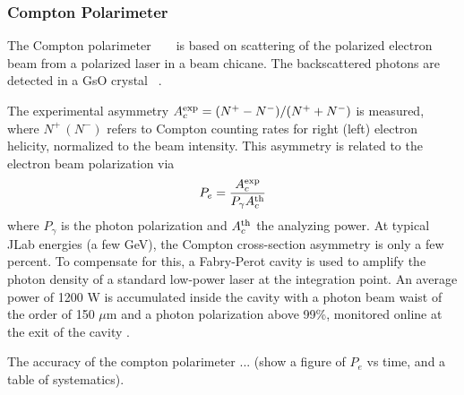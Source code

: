 \subsubsection{Compton Polarimeter}
\label{sec:cpt_exp_meth}

The Compton polarimeter ~\cite{Baylac} \cite{Neyret} ~\cite{megan}
is based on scattering of the polarized electron beam from
a polarized laser in a beam chicane.
The backscattered photons are detected in a GsO crystal ~\cite{megan}.

The experimental
asymmetry $A^{\rm exp}_c=(N^+-N^-)/(N^++N^-)$ is measured, where
$N^+\, (N^-)$ refers to Compton counting rates for right (left)
electron helicity, normalized to the beam intensity. This asymmetry is
related to the electron beam polarization via
\begin{equation}
P_e=\frac{A^{\rm exp}_c}{P_\gamma A^{\rm th}_c}
\label{eq:a_expc}
\end{equation}
where $P_\gamma$ is the photon polarization and $A^{\rm th}_c$ the analyzing
power.  At typical JLab energies (a few GeV), the Compton cross-section
asymmetry is only a few percent.
To compensate for this, a Fabry-Perot cavity
\cite{Jorda} is used to amplify the photon density of a standard
low-power laser at the integration point. An average power of 1200 W
is accumulated inside the cavity with a photon beam waist of the
order of 150 $\mu$m and a photon polarization above 99\%, monitored
online at the exit of the cavity \cite{Falletto}.

The accuracy of the compton polarimeter ... (show a figure of $P_e$ vs
time, and a table of systematics).

